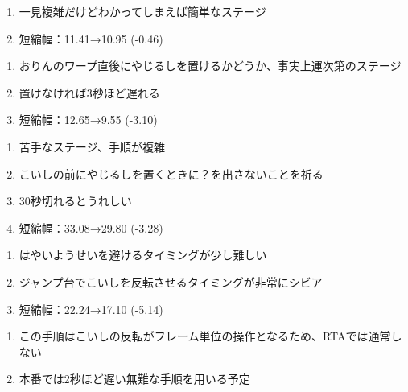 \begin{enumerate}[label={\sarrow}]
\item 一見複雑だけどわかってしまえば簡単なステージ
\item 短縮幅：11.41→10.95 (-0.46)
\end{enumerate}



\clearpage
\begin{enumerate}[label={\sarrow}]
\item おりんのワープ直後にやじるしを置けるかどうか、事実上運次第のステージ
\item 置けなければ3秒ほど遅れる
\item 短縮幅：12.65→9.55 (-3.10)
\end{enumerate}



\begin{enumerate}[label={\sarrow}]
\item 苦手なステージ、手順が複雑
\item こいしの前にやじるしを置くときに？\hspace{0pt}を出さないことを祈る
\item 30秒切れるとうれしい
\item 短縮幅：33.08→29.80 (-3.28)
\end{enumerate}



\begin{enumerate}[label={\sarrow}]
\item はやいようせいを避けるタイミングが少し難しい
\item ジャンプ台でこいしを反転させるタイミングが非常にシビア
\item 短縮幅：22.24→17.10 (-5.14)
\end{enumerate}
\begin{marker}
\begin{enumerate}[label={\sarrow}]
\item この手順はこいしの反転がフレーム単位の操作となるため、RTAでは通常しない
\item 本番では2秒ほど遅い無難な手順を用いる予定
\end{enumerate}
\end{marker}


